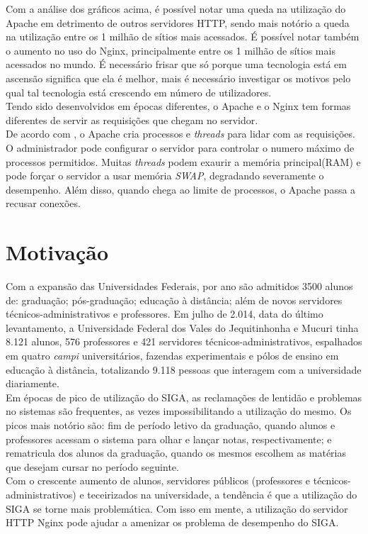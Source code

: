 Com a análise dos gráficos acima, é possível notar uma queda na utilização do 
Apache em detrimento de outros servidores HTTP, sendo mais notório a queda na 
utilização entre os 1 milhão de sítios mais acessados. É possível notar também 
o aumento no uso do Nginx, principalmente entre os 1 milhão de sítios mais 
acessados no mundo. É necessário frisar que só porque uma tecnologia está em 
ascensão significa que ela é melhor, mais é necessário investigar os motivos 
pelo qual tal tecnologia está crescendo em número de utilizadores.\\
Tendo sido desenvolvidos em épocas diferentes, o Apache e o Nginx tem formas 
diferentes de servir as requisições que chegam no servidor.\\
De acordo com , o Apache cria processos e \textit{threads} 
para lidar com as requisições. O administrador pode configurar o servidor para 
controlar o numero máximo de processos permitidos. Muitas \textit{threads} 
podem exaurir a memória principal(RAM) e pode forçar o servidor a usar memória 
\textit{SWAP}, degradando severamente o desempenho. Além disso, quando chega ao 
limite de processos, o Apache passa a recusar conexões.
\section{Motivação}
Com a expansão das Universidades Federais, por ano são admitidos 3500 alunos de:
graduação; pós-graduação; educação à distância; além de 
novos servidores técnicos-administrativos e professores. Em julho de 2.014, 
data do último levantamento, a Universidade Federal dos Vales do Jequitinhonha 
e Mucuri tinha 8.121 alunos, 576 professores e 421 servidores 
técnicos-administrativos, espalhados em quatro \textit{campi} universitários, 
fazendas experimentais e pólos de ensino em educação à distância, totalizando 
9.118 pessoas que interagem com a universidade diariamente.\\
Em épocas de pico de utilização do SIGA, as reclamações de lentidão e problemas no sistemas são frequentes, as vezes impossibilitando a utilização do mesmo. Os picos mais notório são: fim de período letivo da graduação, quando alunos e professores acessam o sistema para olhar e lançar notas, respectivamente; e rematricula dos alunos da graduação, quando os mesmos escolhem as matérias que desejam cursar no período seguinte.\\
Com o crescente aumento de alunos, servidores públicos (professores e técnicos-administrativos) e teceirizados na universidade, a tendência é que a utilização do SIGA se torne mais problemática.
Com isso em mente, a utilização do servidor HTTP Nginx pode ajudar a amenizar 
os problema de desempenho do SIGA.\\
